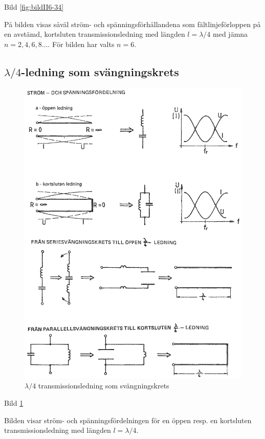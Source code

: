 Bild \ref{fig:bildII6-34}

På bilden visas såväl ström- och spänningsförhållandena som
fältlinjeförloppen på en avstämd, kortsluten transmissionsledning med
längden \(l = \lambda/4\) med jämna \(n = 2, 4, 6, 8 \dots\). För
bilden har valts \(n = 6\).

\subsection{$\lambda/4$-ledning som svängningskrets}

\begin{figure}
  \includegraphics[width=\textwidth]{images/cropped_pdfs/bild_2_6-35.pdf}
  \caption{$\lambda/4$ transmissionsledning som svängningskrets}
  \label{fig:bildII6-35}
\end{figure}

Bild \ref{fig:bildII6-35}

Bilden visar ström- och spänningsfördelningen för en öppen resp. en
kortsluten transmissionsledning med längden \(l = \lambda/4\).

